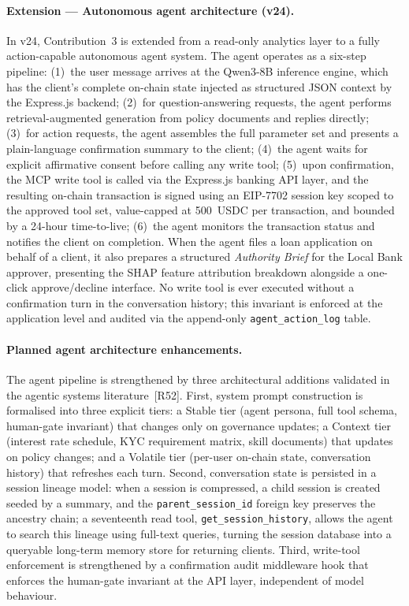 \documentclass[12pt,a4paper]{report}
\begin{document}
\begin{description}[leftmargin=0pt]
\paragraph{Extension --- Autonomous agent architecture (v24).}
In v24, Contribution~3 is extended from a read-only analytics layer to a fully action-capable autonomous agent system. The agent operates as a six-step pipeline: (1)~the user message arrives at the Qwen3-8B inference engine, which has the client's complete on-chain state injected as structured JSON context by the Express.js backend; (2)~for question-answering requests, the agent performs retrieval-augmented generation from policy documents and replies directly; (3)~for action requests, the agent assembles the full parameter set and presents a plain-language confirmation summary to the client; (4)~the agent waits for explicit affirmative consent before calling any write tool; (5)~upon confirmation, the MCP write tool is called via the Express.js banking API layer, and the resulting on-chain transaction is signed using an EIP-7702 session key scoped to the approved tool set, value-capped at 500~USDC per transaction, and bounded by a 24-hour time-to-live; (6)~the agent monitors the transaction status and notifies the client on completion. When the agent files a loan application on behalf of a client, it also prepares a structured \textit{Authority Brief} for the Local Bank approver, presenting the SHAP feature attribution breakdown alongside a one-click approve/decline interface. No write tool is ever executed without a confirmation turn in the conversation history; this invariant is enforced at the application level and audited via the append-only \texttt{agent\_action\_log} table.

\paragraph{Planned agent architecture enhancements.}
The agent pipeline is strengthened by three architectural additions validated in
the agentic systems literature~[R52]. First, system prompt
construction is formalised into three explicit tiers: a Stable tier (agent
persona, full tool schema, human-gate invariant) that changes only on governance
updates; a Context tier (interest rate schedule, KYC requirement matrix, skill
documents) that updates on policy changes; and a Volatile tier (per-user on-chain
state, conversation history) that refreshes each turn. Second, conversation state
is persisted in a session lineage model: when a session is compressed, a child
session is created seeded by a summary, and the \texttt{parent\_session\_id}
foreign key preserves the ancestry chain; a seventeenth read tool,
\texttt{get\_session\_history}, allows the agent to search this lineage using
full-text queries, turning the session database into a queryable long-term
memory store for returning clients. Third, write-tool enforcement is strengthened
by a confirmation audit middleware hook that enforces the human-gate invariant at
the API layer, independent of model behaviour.


\end{description}
\end{document}
